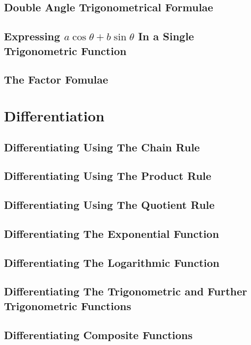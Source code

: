 \documentclass{article}
\begin{document}
	\subsection{Double Angle Trigonometrical Formulae}
	\subsection{Expressing $a\cos\theta + b\sin\theta$ In a Single Trigonometric Function}
	\subsection{The Factor Fomulae}
	\section{Differentiation}
	\subsection{Differentiating Using The Chain Rule}
	\subsection{Differentiating Using The Product Rule}
	\subsection{Differentiating Using The Quotient Rule}
	\subsection{Differentiating The Exponential Function}
	\subsection{Differentiating The Logarithmic Function}
	\subsection{Differentiating The Trigonometric and Further Trigonometric Functions}
	\subsection{Differentiating Composite Functions}
\end{document}
